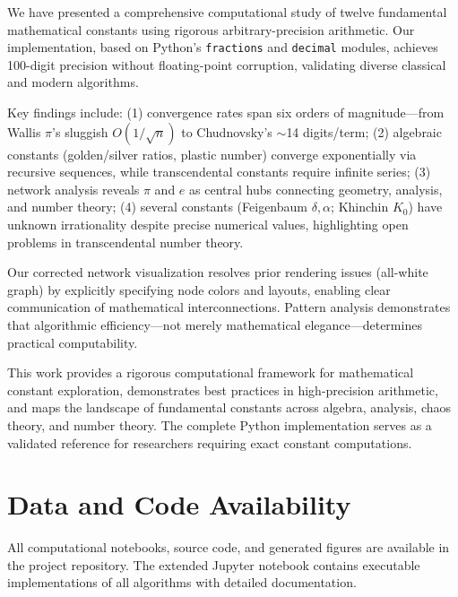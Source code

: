 \documentclass[11pt,a4paper]{article}
\begin{document}
We have presented a comprehensive computational study of twelve fundamental mathematical constants using rigorous arbitrary-precision arithmetic. Our implementation, based on Python's \texttt{fractions} and \texttt{decimal} modules, achieves 100-digit precision without floating-point corruption, validating diverse classical and modern algorithms.

Key findings include: (1) convergence rates span six orders of magnitude—from Wallis $\pi$'s sluggish $O(1/\sqrt{n})$ to Chudnovsky's $\sim$14 digits/term; (2) algebraic constants (golden/silver ratios, plastic number) converge exponentially via recursive sequences, while transcendental constants require infinite series; (3) network analysis reveals $\pi$ and $e$ as central hubs connecting geometry, analysis, and number theory; (4) several constants (Feigenbaum $\delta, \alpha$; Khinchin $K_0$) have unknown irrationality despite precise numerical values, highlighting open problems in transcendental number theory.

Our corrected network visualization resolves prior rendering issues (all-white graph) by explicitly specifying node colors and layouts, enabling clear communication of mathematical interconnections. Pattern analysis demonstrates that algorithmic efficiency—not merely mathematical elegance—determines practical computability.

This work provides a rigorous computational framework for mathematical constant exploration, demonstrates best practices in high-precision arithmetic, and maps the landscape of fundamental constants across algebra, analysis, chaos theory, and number theory. The complete Python implementation serves as a validated reference for researchers requiring exact constant computations.

\section*{Data and Code Availability}

All computational notebooks, source code, and generated figures are available in the project repository. The extended Jupyter notebook contains executable implementations of all algorithms with detailed documentation.



\end{document}
